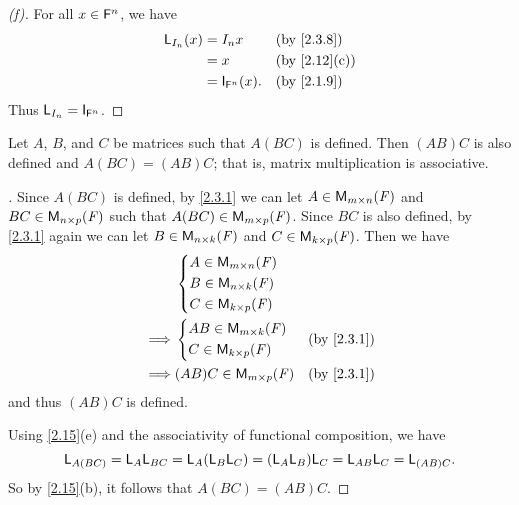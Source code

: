 \begin{proof}[(f)]
  For all \(x \in \mathsf{F}^n\), we have
  \begin{align*}
    \L_{I_n}(x) & = I_n x              &  & \text{(by \cref{2.3.8})}   \\
                & = x                  &  & \text{(by \cref{2.12}(c))} \\
                & = \IT_{\vs{F}^n}(x). &  & \text{(by \cref{2.1.9})}
  \end{align*}
  Thus \(\L_{I_n} = \IT_{\vs{F}^n}\).
\end{proof}

\begin{thm}\label{2.16}
  Let \(A\), \(B\), and \(C\) be matrices such that \(A (BC)\) is defined.
  Then \((AB) C\) is also defined and \(A (BC) = (AB) C\);
  that is, matrix multiplication is associative.
\end{thm}

\begin{proof}[]
  Since \(A (BC)\) is defined, by \cref{2.3.1} we can let \(A \in \mathsf{M}_{{m} \times n}({\mathit{F}})\) and \(BC \in \mathsf{M}_{{n} \times p}({\mathit{F}})\) such that \(A (BC) \in \mathsf{M}_{{m} \times p}({\mathit{F}})\).
  Since \(BC\) is also defined, by \cref{2.3.1} again we can let \(B \in \mathsf{M}_{{n} \times k}({\mathit{F}})\) and \(C \in \mathsf{M}_{{k} \times p}({\mathit{F}})\).
  Then we have
  \begin{align*}
             & \begin{dcases}
                 A \in \MS           \\
                 B \in \ms{n}{k}{\F} \\
                 C \in \ms{k}{p}{\F}
               \end{dcases}                                    \\
    \implies & \begin{dcases}
                 AB \in \ms{m}{k}{\F} \\
                 C \in \ms{k}{p}{\F}
               \end{dcases}  &  & \text{(by \cref{2.3.1})}            \\
    \implies & (AB) C \in \ms{m}{p}{\F} &  & \text{(by \cref{2.3.1})}
  \end{align*}
  and thus \((AB) C\) is defined.

  Using \cref{2.15}(e) and the associativity of functional composition, we have
  \[
    \mathsf{L}_{A (BC)} = \mathsf{L}_A \mathsf{L}_{BC} = \mathsf{L}_A (\mathsf{L}_B \mathsf{L}_C) = (\mathsf{L}_A \mathsf{L}_B) \mathsf{L}_C = \mathsf{L}_{AB} \mathsf{L}_C = \mathsf{L}_{(AB) C}.
  \]
  So by \cref{2.15}(b), it follows that \(A (BC) = (AB) C\).
\end{proof}

